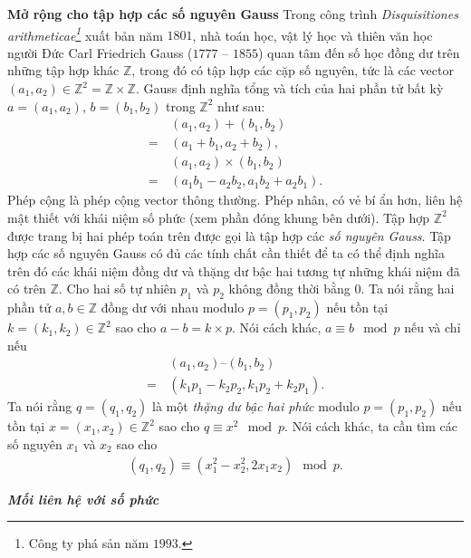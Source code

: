 \begin{multicols}{2}
\begin{tBox}
	\end{tBox}
	\textbf{\color{toanhocdoisong}Mở rộng cho tập hợp các số nguyên Gauss}
	\vskip 0.1cm
	Trong công trình \textit{Disquisitiones arithmeticae\footnote[5]{\color{toanhocdoisong}Công ty phá sản năm $1993$.}}  xuất bản năm $1801$, nhà toán học, vật lý học và thiên văn học người Đức Carl Friedrich Gauss ($1777$ -- $1855$) quan tâm đến số học đồng dư trên những tập hợp khác $\mathbb Z$, trong đó có tập hợp các cặp số nguyên, tức là các vector $(a_1, a_2) \in \mathbb Z^2 = \mathbb Z \times \mathbb Z$.
	\vskip 0.1cm
	Gauss định nghĩa tổng và tích của hai phần tử bất kỳ $a = (a_1, a_2)$, $b = (b_1, b_2)$ trong $\mathbb Z^2$ như sau:
	\begin{align*}
		&(a_1, a_2) + (b_1, b_2) \\
		= \,&(a_1 + b_1, a_2 + b_2), \\
		&(a_1, a_2) \times (b_1, b_2) \\
		= \,&(a_1  b_1 - a_2  b_2, a_1  b_2 + a_2  b_1).
	\end{align*}
	Phép cộng là phép cộng vector thông thường. Phép nhân, có vẻ bí ẩn hơn, liên hệ mật thiết với khái niệm số phức (xem phần đóng khung bên dưới).
	\vskip 0.1cm
	Tập hợp $\mathbb Z^2$ được trang bị hai phép toán trên được gọi là tập hợp các {\em số nguyên Gauss}. Tập hợp các số nguyên Gauss có đủ các tính chất cần thiết để ta có thể định nghĩa trên đó các khái niệm đồng dư và thặng dư bậc hai tương tự những khái niệm đã có trên $\mathbb Z$.
	\vskip 0.1cm
	Cho hai số tự nhiên $p_1$ và $p_2$ không đồng thời bằng $0$. Ta nói rằng hai phần tử $a, b \in \mathbb Z$ đồng dư với nhau modulo $p = (p_1, p_2)$ nếu tồn tại $k = (k_1, k_2) \in \mathbb Z^2$ sao cho $a - b = k \times p$. Nói cách khác, $a \equiv b \mod{p}$ nếu và chỉ nếu
	\begin{align*}
		&(a_1, a_2) – (b_1, b_2) \\
		= \,&(k_1 p_1 - k_2 p_2, k_1 p_2 + k_2 p_1).
	\end{align*}
	Ta nói rằng $q = (q_1, q_2)$ là một {\em thặng dư bậc hai phức} modulo $p = (p_1, p_2)$ nếu tồn tại $x = (x_1, x_2) \in \mathbb Z^2$ sao cho $q \equiv x^2 \mod{p}$. Nói cách khác, ta cần tìm các số nguyên $x_1$ và $x_2$ sao cho
	\begin{align*}
		(q_1, q_2) \equiv (x_1^2 - x_2^2, 2 x_1 x_2) \mod{p}.
	\end{align*}
	\vskip 0.1cm
	\begin{tBox}
		\textbf{\textit{\color{toanhocdoisong}Mối liên hệ với số phức}}
		\vskip 0.1cm
		\begin{figure}

\end{figure}
\end{tBox}
\end{multicols}
